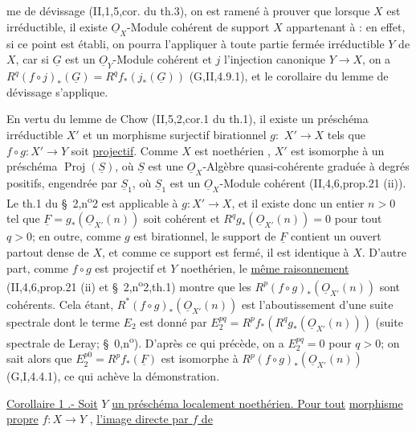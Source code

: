 me de dévissage (II,1,5,cor. du th.3), on est ramené à prouver que
lorsque $X$ est irréductible, il existe  $\underline O_X$-Module cohérent de support
$X$ appartenant à : en effet, si ce point est établi, on
pourra l'appliquer à toute partie fermée irréductible $Y$ de $X$, car
si $\underline G$ est un $\underline O_Y$-Module cohérent et $j$ l'injection canonique $Y\to X$, on
a $R^q(f\circ j)_*(\underline G)=R^qf_*(j_*(\underline G))$ (G,II,4.9.1), et le corollaire du lemme
de dévissage s'applique.

En vertu du lemme de Chow (II,5,2,cor.1 du th.1), il existe un
préschéma irréductible $X'$ et un morphisme  surjectif  birationnel $g:$
$X'\to X$ tels que $f\circ g:X'\to Y$ soit \uline{projectif}. Comme $X$ est noethérien
,
$X'$ est isomorphe à un
préschéma $\operatorname{Proj}(\underline S)$, où $\underline S$ est une $\underline O_X$-Algèbre  quasi-cohérente
graduée à degrés positifs, engendrée par $\underline S_1$, où $\underline S_1$ est un $\underline O_X$-Module
cohérent (II,4,6,prop.21 (ii)). Le th.1 du \S\ 2,n\textsuperscript{o}2 est applicable
à $g:X'\to X$, et il existe donc un entier $n>0$ tel que 
$\underline F=g_*(\underline O_{X'}(n))$ soit cohérent et $R^qg_*(\underline O_{X'}(n))=0$ pour tout $q>0$; en outre,
comme $g$ est birationnel, le support de $\underline F$ contient un ouvert
partout dense de $X$, et comme ce support est fermé, il est identique
à $X$. D'autre part, comme $f\circ g$ est projectif et $Y$ noethérien,
le \uline{même raisonnement} (II,4,6,prop.21 (ii) et \S\ 2,n\textsuperscript{o}2,th.1) montre
que les $R^p(f\circ g)_*(\underline O_{X'}(n))$ sont cohérents. Cela étant, 
$R^*(f\circ g)_*(\underline O_{X'}(n))$ est l'aboutissement d'une suite spectrale dont le
terme $E_2$ est donné par $E_2^{pq}=R^pf_*(R^qg_*(\underline O_{X'}(n)))$ (suite spectrale de
Leray; \S\ 0,n\textsuperscript{o}\quad). D'après ce qui précède, on a $E_2^{pq}=0$ pour $q>0$;
on sait alors que  $E_2^{p0}=R^pf_*(\underline F)$ est isomorphe à $R^p(f\circ g)_*(\underline O_{X'}(n))$
(G,I,4.4.1), ce qui achève la démonstration.

\uline{Corollaire 1 .- Soit} $Y$ \uline{un préschéma localement noethérien. Pour tout}
\uline{morphisme propre} $f:X\to Y$ , \uline{l'image directe par $f$ de}


